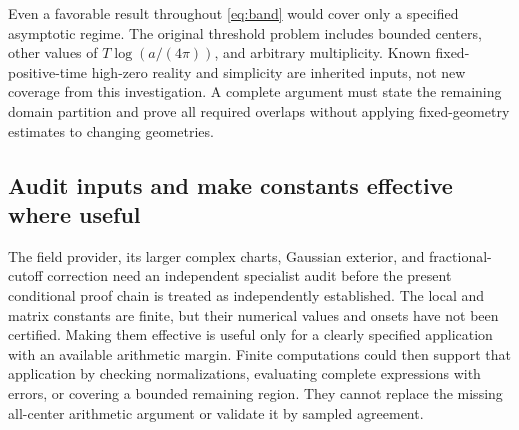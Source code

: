 Even a favorable result throughout \eqref{eq:band} would cover only a
specified asymptotic regime. The original threshold problem includes
bounded centers, other values of \(T\log(a/(4\pi))\), and arbitrary
multiplicity. Known fixed-positive-time high-zero reality and simplicity
are inherited inputs, not new coverage from this investigation.
A complete argument must state the remaining domain partition and
prove all required overlaps without applying fixed-geometry estimates
to changing geometries.

\subsection{Audit inputs and make constants effective where useful}

The field provider, its larger complex charts, Gaussian exterior, and
fractional-cutoff correction need an independent specialist audit before
the present conditional proof chain is treated as independently
established. The local and matrix constants are finite, but their
numerical values and onsets have not been certified. Making them
effective is useful only for a clearly specified application with an
available arithmetic margin.
Finite computations could then support that application by checking
normalizations, evaluating complete expressions with errors, or covering
a bounded remaining region. They cannot replace the missing
all-center arithmetic argument or validate it by sampled agreement.
